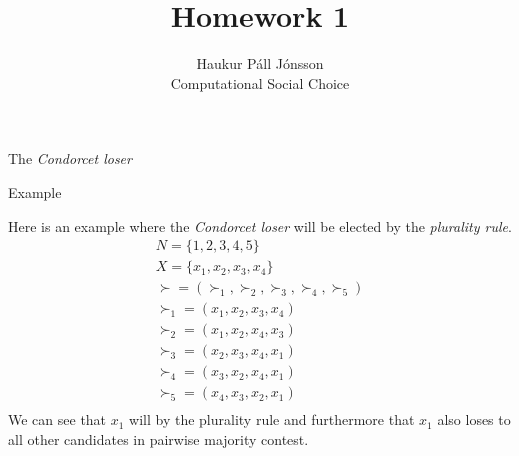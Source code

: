 \documentclass[12pt]{article}
\newenvironment{question}[2][Question]{\begin{trivlist}
\item[\hskip \labelsep {\bfseries #1}\hskip \labelsep {\bfseries #2.}]}{\end{trivlist}}
\newenvironment{answer}[2][Answer]{\begin{trivlist}
\item[\hskip \labelsep {\bfseries #1}\hskip \labelsep {\bfseries #2:}]}{\end{trivlist}}
\begin{document}
\renewcommand{\theenumi}{\roman{enumi}}

\let\oldsum\sum
\renewcommand{\sum}[3]{\oldsum\limits_{#1}^{#2}#3}
\let\oldprod\prod
\renewcommand{\prod}[3]{\oldprod\limits_{#1}^{#2}#3}

\newcommand\Dunion{
  \mathop{\mathchoice
    {\ooalign{$\displaystyle\bigcup$\cr\hss\scalebox{.65}{\raisebox{0.45ex}{\sffamily +}}\hss}}
    {\ooalign{$\textstyle\bigcup$\cr\hss\scalebox{.9}{\raisebox{0.5ex}{\tiny\sffamily +}}\hss}}
    {\ooalign{$\scriptstyle\bigcup$\cr\hss\scalebox{.45}{\raisebox{0.3ex}{\sffamily +}}\hss}}
    {\ooalign{$\scriptscriptstyle\bigcup$\cr\hss\scalebox{.38}{\raisebox{0.3ex}{\sffamily +}}\hss}}
    }
}

\title{Homework 1}
\author{Haukur Páll Jónsson\\
Computational Social Choice}

\maketitle

\begin{question}{1}

The \textit{Condorcet loser}
\end{question}

\begin{answer}{a)}{Example}

Here is an example where the \textit{Condorcet loser} will be elected by the \textit{plurality rule}.
\begin{align*}
N=\{1,2,3,4,5\} \\
X=\{x_1,x_2,x_3,x_4\} \\
\boldsymbol{\succ}=(\succ_1,\succ_2,\succ_3,\succ_4,\succ_5) \\
\succ_1=(x_1,x_2,x_3,x_4) \\
\succ_2=(x_1,x_2,x_4,x_3)\\
\succ_3=(x_2,x_3,x_4,x_1)\\
\succ_4=(x_3,x_2,x_4,x_1)\\
\succ_5=(x_4,x_3,x_2,x_1)\\
\end{align*}
We can see that $x_1$ will by the plurality rule and furthermore that $x_1$ also loses to all other candidates in pairwise majority contest.
\end{answer}
\end{document}
